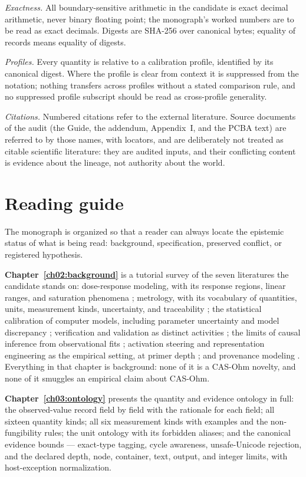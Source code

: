\emph{Exactness.} All boundary-sensitive arithmetic in the candidate is exact decimal arithmetic, never binary floating point; the monograph's worked numbers are to be read as exact decimals. Digests are SHA-256 over canonical bytes; equality of records means equality of digests.

\emph{Profiles.} Every quantity is relative to a calibration profile, identified by its canonical digest. Where the profile is clear from context it is suppressed from the notation; nothing transfers across profiles without a stated comparison rule, and no suppressed profile subscript should be read as cross-profile generality.

\emph{Citations.} Numbered citations refer to the external literature. Source documents of the audit (the Guide, the addendum, Appendix~I, and the PCBA text) are referred to by those names, with locators, and are deliberately not treated as citable scientific literature: they are audited inputs, and their conflicting content is evidence about the lineage, not authority about the world.

\section{Reading guide}\label{ch01:guide}

The monograph is organized so that a reader can always locate the epistemic status of what is being read: background, specification, preserved conflict, or registered hypothesis.

\textbf{Chapter~\ref{ch02:background}} is a tutorial survey of the seven literatures the candidate stands on: dose-response modeling, with its response regions, linear ranges, and saturation phenomena \cite{ritz}; metrology, with its vocabulary of quantities, units, measurement kinds, uncertainty, and traceability \cite{vim,gum}; the statistical calibration of computer models, including parameter uncertainty and model discrepancy \cite{kennedyohagan}; verification and validation as distinct activities \cite{sargent}; the limits of causal inference from observational fits \cite{pearl}; activation steering and representation engineering as the empirical setting, at primer depth \cite{zourepe}; and provenance modeling \cite{prov}. Everything in that chapter is background: none of it is a CAS-Ohm novelty, and none of it smuggles an empirical claim about CAS-Ohm.

\textbf{Chapter~\ref{ch03:ontology}} presents the quantity and evidence ontology in full: the observed-value record field by field with the rationale for each field; all sixteen quantity kinds; all six measurement kinds with examples and the non-fungibility rules; the unit ontology with its forbidden aliases; and the canonical evidence bounds --- exact-type tagging, cycle awareness, unsafe-Unicode rejection, and the declared depth, node, container, text, output, and integer limits, with host-exception normalization.


